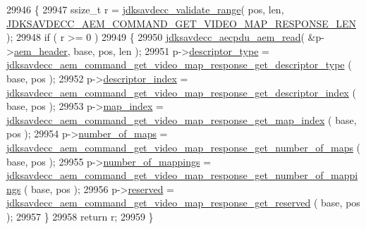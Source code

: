\begin{DoxyCode}
29946 \{
29947     ssize\_t r = \hyperlink{group__util_ga9c02bdfe76c69163647c3196db7a73a1}{jdksavdecc\_validate\_range}( pos, len, 
      \hyperlink{group__command__get__video__map__response_gac6a37b122e7b0c7d2a90ed750cfb748a}{JDKSAVDECC\_AEM\_COMMAND\_GET\_VIDEO\_MAP\_RESPONSE\_LEN} );
29948     \textcolor{keywordflow}{if} ( r >= 0 )
29949     \{
29950         \hyperlink{group__aecpdu__aem_gae2421015dcdce745b4f03832e12b4fb6}{jdksavdecc\_aecpdu\_aem\_read}( &p->\hyperlink{structjdksavdecc__aem__command__get__video__map__response_ae1e77ccb75ff5021ad923221eab38294}{aem\_header}, base, pos, len );
29951         p->\hyperlink{structjdksavdecc__aem__command__get__video__map__response_ab7c32b6c7131c13d4ea3b7ee2f09b78d}{descriptor\_type} = 
      \hyperlink{group__command__get__video__map__response_ga006c28cdab94f692cdf69e4b9d89bd76}{jdksavdecc\_aem\_command\_get\_video\_map\_response\_get\_descriptor\_type}
      ( base, pos );
29952         p->\hyperlink{structjdksavdecc__aem__command__get__video__map__response_a042bbc76d835b82d27c1932431ee38d4}{descriptor\_index} = 
      \hyperlink{group__command__get__video__map__response_ga5274f3ec8fc2f308ccda8ca3515dec34}{jdksavdecc\_aem\_command\_get\_video\_map\_response\_get\_descriptor\_index}
      ( base, pos );
29953         p->\hyperlink{structjdksavdecc__aem__command__get__video__map__response_a3a5e0547986898ad64c07f238d8b7bcf}{map\_index} = 
      \hyperlink{group__command__get__video__map__response_ga8e858b1e262cdc86268f7dda3a1b860d}{jdksavdecc\_aem\_command\_get\_video\_map\_response\_get\_map\_index}
      ( base, pos );
29954         p->\hyperlink{structjdksavdecc__aem__command__get__video__map__response_a6d00316ed943197ab46c0af22c1d430a}{number\_of\_maps} = 
      \hyperlink{group__command__get__video__map__response_ga8e9396b67e16b4b4eedcbb4c1ef4636e}{jdksavdecc\_aem\_command\_get\_video\_map\_response\_get\_number\_of\_maps}
      ( base, pos );
29955         p->\hyperlink{structjdksavdecc__aem__command__get__video__map__response_ac7db472c5622ef473d5d0a5c416d5531}{number\_of\_mappings} = 
      \hyperlink{group__command__get__video__map__response_gad8afdd4a551ad08ed2c587bb828456f8}{jdksavdecc\_aem\_command\_get\_video\_map\_response\_get\_number\_of\_mappings}
      ( base, pos );
29956         p->\hyperlink{structjdksavdecc__aem__command__get__video__map__response_a5a6ed8c04a3db86066924b1a1bf4dad3}{reserved} = 
      \hyperlink{group__command__get__video__map__response_ga897f07dac2c5d29f6e895500c3c122ff}{jdksavdecc\_aem\_command\_get\_video\_map\_response\_get\_reserved}
      ( base, pos );
29957     \}
29958     \textcolor{keywordflow}{return} r;
29959 \}
\end{DoxyCode}


